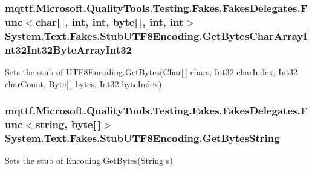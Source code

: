 \hypertarget{class_system_1_1_text_1_1_fakes_1_1_stub_u_t_f8_encoding_a81a42b7bb6d8d39719318e0eb63a4525}{
\subsubsection[{Get\-Bytes\-Char\-Array\-Int32\-Int32\-Byte\-Array\-Int32}]{\setlength{\rightskip}{0pt plus 5cm}mqttf.\-Microsoft.\-Quality\-Tools.\-Testing.\-Fakes.\-Fakes\-Delegates.\-Func$<$char\mbox{[}$\,$\mbox{]}, int, int, byte\mbox{[}$\,$\mbox{]}, int, int$>$ System.\-Text.\-Fakes.\-Stub\-U\-T\-F8\-Encoding.\-Get\-Bytes\-Char\-Array\-Int32\-Int32\-Byte\-Array\-Int32}}\label{class_system_1_1_text_1_1_fakes_1_1_stub_u_t_f8_encoding_a81a42b7bb6d8d39719318e0eb63a4525}


Sets the stub of U\-T\-F8\-Encoding.\-Get\-Bytes(\-Char\mbox{[}$\,$\mbox{]} chars, Int32 char\-Index, Int32 char\-Count, Byte\mbox{[}$\,$\mbox{]} bytes, Int32 byte\-Index)

\hypertarget{class_system_1_1_text_1_1_fakes_1_1_stub_u_t_f8_encoding_aebb1b7fb4eb0a87d4401976dad74c0ff}{
\subsubsection[{Get\-Bytes\-String}]{\setlength{\rightskip}{0pt plus 5cm}mqttf.\-Microsoft.\-Quality\-Tools.\-Testing.\-Fakes.\-Fakes\-Delegates.\-Func$<$string, byte\mbox{[}$\,$\mbox{]}$>$ System.\-Text.\-Fakes.\-Stub\-U\-T\-F8\-Encoding.\-Get\-Bytes\-String}}\label{class_system_1_1_text_1_1_fakes_1_1_stub_u_t_f8_encoding_aebb1b7fb4eb0a87d4401976dad74c0ff}


Sets the stub of Encoding.\-Get\-Bytes(\-String s)

